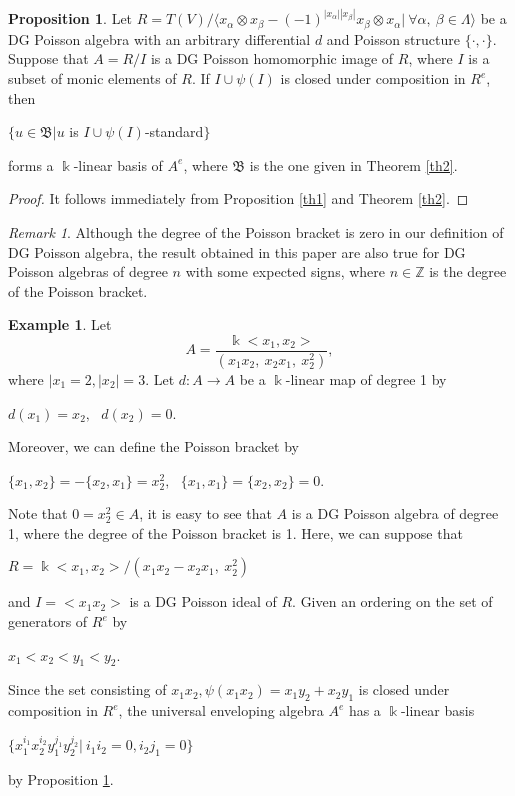 \documentclass[a4paper,10pt]{amsart}
\theoremstyle{definition}
\newtheorem{exa}[theorem]{Example}
\newtheorem{prop}[theorem]{Proposition}
\theoremstyle{remark}
\newtheorem{remark}[theorem]{Remark}
\numberwithin{equation}{section}
\begin{document}
\begin{prop}\label{prop1}
Let $R=T(V)/\langle x_{\alpha}\otimes
x_{\beta}-(-1)^{|x_{\alpha}||x_{\beta}|}x_{\beta}\otimes x_{\alpha}|
~\forall \alpha, ~\beta \in\Lambda \rangle$ be a DG Poisson algebra
with an arbitrary differential $d$ and Poisson structure $\{\cdot, \cdot\}$.
Suppose that $A=R/I$ is a DG Poisson homomorphic image of $R$, where
$I$ is a subset of monic elements of $R$. If $I\cup \psi (I)$ is
closed under composition in $R^{e}$, then
\begin{center}
$\{u\in\mathfrak{B}|u$ is $I\cup \psi(I)$-standard$\}$
 \end{center}
forms a $\Bbbk$-linear basis of $A^{e}$, where $\mathfrak{B}$ is the
one given in Theorem \ref{th2}.
\end{prop}

\begin{proof}
It follows immediately from Proposition \ref{th1} and Theorem \ref{th2}.
\end{proof}

\begin{remark}
Although the degree of the Poisson bracket is zero in our definition
of DG Poisson algebra, the result obtained in this paper are
also true for DG Poisson algebras of degree $n$ with some expected
signs, where $n\in \mathbb{Z}$ is the degree of the Poisson bracket.
\end{remark}

\begin{exa}
Let $$A=\frac{\Bbbk<x_{1}, x_{2}>}{(x_{1}x_{2}, ~x_{2}x_{1}, ~x_{2}^2)},$$
where $|x_{1}=2, |x_{2}|=3$.
Let $d: A\rightarrow A$ be a $\Bbbk$-linear map of degree 1 by
\begin{center}
$d(x_{1})=x_{2}, ~~~d(x_{2})=0$.
 \end{center}
Moreover, we can define the Poisson bracket by
\begin{center}
$\{x_{1}, x_{2}\}=-\{x_{2}, x_{1}\}=x_{2}^2, ~~~\{x_{1}, x_{1}\}=\{x_{2}, x_{2}\}=0$.
 \end{center}
Note that $0=x_2^2\in A$, it is easy to see that $A$ is a DG Poisson algebra of degree 1, where the degree of the Poisson bracket is 1.
Here, we can suppose that
\begin{center}
$R=\Bbbk<x_{1}, x_{2}>/(x_{1}x_{2}-x_{2}x_{1}, ~x_{2}^2)$
 \end{center}
and  $I=<x_1x_{2}>$ is a DG Poisson ideal of $R$. Given an ordering on the set of generators of $R^e$ by
\begin{center}
$x_{1}<x_{2}<y_{1}<y_{2}$.
 \end{center}
Since the set consisting of $x_1x_{2}, \psi(x_1x_{2})=x_1y_2+x_2y_1$
is closed under composition in $R^e $, the universal enveloping algebra $A^e$ has a $\Bbbk$-linear basis
\begin{center}
$\{x_{1}^{i_1}x_{2}^{i_2}y_{1}^{j_1}y_{2}^{j_2} | ~i_1i_{2}=0, i_2j_1=0\}$
 \end{center}
by Proposition \ref{prop1}.
\end{exa}
\end{document}
